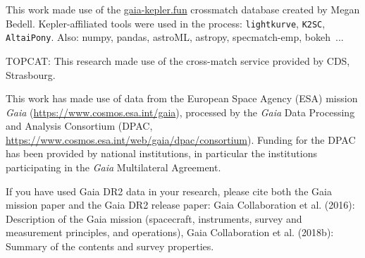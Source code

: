 \documentclass{aa}
\begin{document}
\begin{acknowledgements}
This work made use of the \url{gaia-kepler.fun} crossmatch database created by Megan Bedell.
Kepler-affiliated tools were used in the process: \texttt{lightkurve}, \texttt{K2SC}, \texttt{AltaiPony}.
Also: numpy, pandas, astroML, astropy, specmatch-emp, bokeh~\citep{bokeh}...

TOPCAT: This research made use of the cross-match service provided by CDS, Strasbourg.

This work has made use of data from the European Space Agency (ESA) mission
{\it Gaia} (\url{https://www.cosmos.esa.int/gaia}), processed by the {\it Gaia}
Data Processing and Analysis Consortium (DPAC,
\url{https://www.cosmos.esa.int/web/gaia/dpac/consortium}). Funding for the DPAC
has been provided by national institutions, in particular the institutions
participating in the {\it Gaia} Multilateral Agreement.

If you have used Gaia DR2 data in your research, please cite both the Gaia mission paper and the Gaia DR2 release paper:
Gaia Collaboration et al. (2016): Description of the Gaia mission (spacecraft, instruments, survey and measurement principles, and operations), Gaia Collaboration et al. (2018b): Summary of the contents and survey properties.


\end{acknowledgements}

\end{document}
